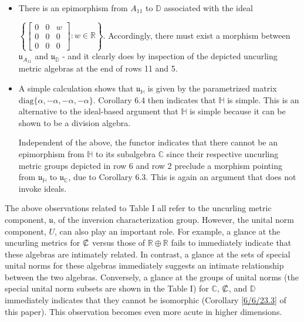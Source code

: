 \documentclass{amsart}
\numberwithin{equation}{section}
\theoremstyle{definition}
\numberwithin{theorem}{section}
\begin{document}
\begin{itemize}
 $\left\{\left[\begin{array}{ccc}
0  & 0 & w   \\
 0 & 0 & v \\
 0 & 0 & 0    
\end{array}\right]:w,v\in\mathbb{R}\right\}$.
The functor then implies that there must exist a morphism from $\mathfrak{u}_{A_{12}}$ to $\mathfrak{u}_{\mathbb{D}}$.  Indeed, existence of the latter morphism is obvious from the last entries in rows 12 and 5 of Table I. 
 \item There is an epimorphism from $A_{11}$ to $\mathbb{D}$ associated with the ideal 
 
 $ \left\{\left[\begin{array}{ccc}
0  & 0 & w   \\
 0 & 0 & 0 \\
 0 & 0 & 0    
\end{array}\right]:w\in\mathbb{R} \right\} $. Accordingly, there must exist a morphism between $\mathfrak{u}_{A_{11}}$ and $\mathfrak{u}_{\mathbb{D}}$  - and it clearly does by inspection of the depicted uncurling metric algebras at the end of rows 11 and 5.  
 \item A simple calculation shows that $\mathfrak{u}_{\mathbb{H}}$ is given by the parametrized matrix $\text{diag}\{\alpha,-\alpha,-\alpha,-\alpha\}$.  Corollary 6.4 then indicates that  $\mathbb{H}$ is simple.  This is an alternative to the ideal-based argument that $\mathbb{H}$ is simple because it can be shown to be a division algebra.

Independent of the above, the functor indicates that there cannot be an epimorphism from  $\mathbb{H}$ to its subalgebra $\mathbb{C}$ since 	their respective uncurling metric groups depicted in row 6 and row 2 preclude a morphism pointing from $\mathfrak{u}_{\mathbb{H}}$ to $\mathfrak{u}_{\mathbb{C}}$, due to Corollary 6.3.  This is again an argument that does not invoke ideals.
\end{itemize}


 The above observations related to Table I all refer to the uncurling metric component, $\mathfrak{u}$, of the inversion characterization group.  However, the unital norm component, $U$, can also play an important role.  For example, a glance at the uncurling metrics for $\slashed{\mathbb{C}}$ versus those of $\mathbb{R}\oplus\mathbb{R}$ fails to immediately indicate that these algebras are intimately related.   In contrast, a glance at the sets of special unital norms for these algebras immediately suggests an intimate relationship between the two algebras. Conversely, a glance at the groups of unital norms (the special unital norm subsets are shown in the Table I) for $\mathbb{C}$, $\slashed{\mathbb{C}}$, and $\mathbb{D}$ immediately indicates that they cannot be isomorphic (Corollary \ref{6/6/23.3} of this paper).  This observation becomes even more acute in higher dimensions.  
 
\end{document}
